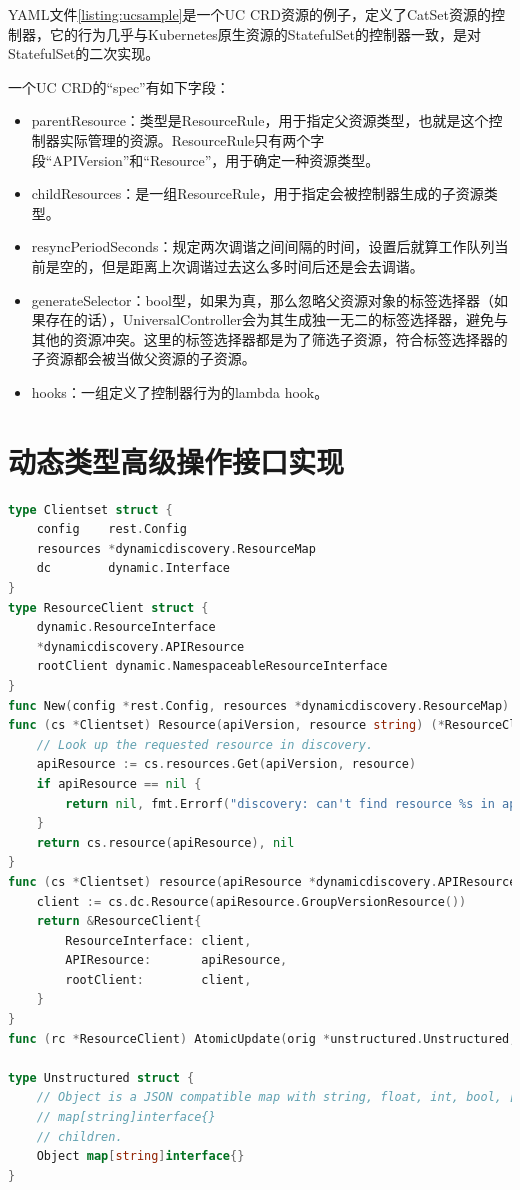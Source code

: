 \documentclass[macfonts,master]{njuthesis}
\begin{document}
YAML文件\ref{listing:ucsample}是一个UC CRD资源的例子，定义了CatSet资源的控制器，它的行为几乎与Kubernetes原生资源的StatefulSet的控制器一致，是对StatefulSet的二次实现。

一个UC CRD的“spec”有如下字段：

\begin{itemize}
	\item parentResource：类型是ResourceRule，用于指定父资源类型，也就是这个控制器实际管理的资源。ResourceRule只有两个字段“APIVersion”和“Resource”，用于确定一种资源类型。
	\item childResources：是一组ResourceRule，用于指定会被控制器生成的子资源类型。
	\item resyncPeriodSeconds：规定两次调谐之间间隔的时间，设置后就算工作队列当前是空的，但是距离上次调谐过去这么多时间后还是会去调谐。
	\item generateSelector：bool型，如果为真，那么忽略父资源对象的标签选择器（如果存在的话），UniversalController会为其生成独一无二的标签选择器，避免与其他的资源冲突。这里的标签选择器都是为了筛选子资源，符合标签选择器的子资源都会被当做父资源的子资源。
	\item hooks：一组定义了控制器行为的lambda hook。
\end{itemize}

\section{动态类型高级操作接口实现}

\begin{lstlisting}[language=Go,caption=客户端实现,label=listing:client]
type Clientset struct {
	config    rest.Config
	resources *dynamicdiscovery.ResourceMap
	dc        dynamic.Interface
}
type ResourceClient struct {
	dynamic.ResourceInterface
	*dynamicdiscovery.APIResource
	rootClient dynamic.NamespaceableResourceInterface
}
func New(config *rest.Config, resources *dynamicdiscovery.ResourceMap) (*Clientset, error)
func (cs *Clientset) Resource(apiVersion, resource string) (*ResourceClient, error) {
	// Look up the requested resource in discovery.
	apiResource := cs.resources.Get(apiVersion, resource)
	if apiResource == nil {
		return nil, fmt.Errorf("discovery: can't find resource %s in apiVersion %s", resource, apiVersion)
	}
	return cs.resource(apiResource), nil
}
func (cs *Clientset) resource(apiResource *dynamicdiscovery.APIResource) *ResourceClient {
	client := cs.dc.Resource(apiResource.GroupVersionResource())
	return &ResourceClient{
		ResourceInterface: client,
		APIResource:       apiResource,
		rootClient:        client,
	}
}
func (rc *ResourceClient) AtomicUpdate(orig *unstructured.Unstructured, update func(obj *unstructured.Unstructured) bool) (result *unstructured.Unstructured, err error)

type Unstructured struct {
	// Object is a JSON compatible map with string, float, int, bool, []interface{}, or
	// map[string]interface{}
	// children.
	Object map[string]interface{}
}
\end{lstlisting}
\end{document}
